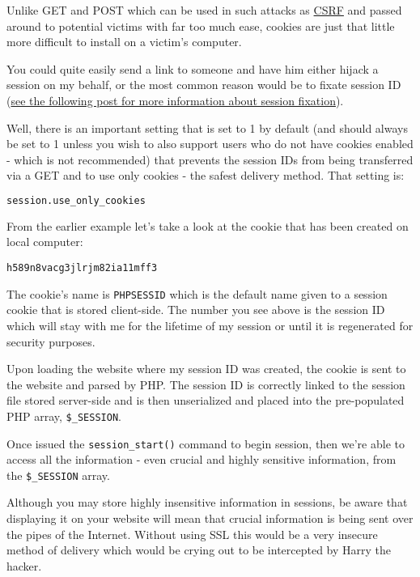 Unlike GET and POST which can be used in such attacks as \href{http://www.talkphp.com/advanced-php-programming/1063-cross-site-request-forgeries.html}{CSRF} and passed around to potential victims with far too much ease, cookies are just that little more difficult to install on a victim's computer.

You could quite easily send a link to someone and have him either hijack a session on my behalf, or the most common reason would be to fixate session ID (\href{http://www.talkphp.com/tips-tricks/1024-tips-php-security-post1813.html#post1813}{see the following post for more information about session fixation}).

Well, there is an important setting that is set to 1 by default (and should always be set to 1 unless you wish to also support users who do not have cookies enabled - which is not recommended) that prevents the session IDs from being transferred via a GET and to use only cookies - the safest delivery method. That setting is:

\begin{lstlisting}[language=bash]
session.use_only_cookies
\end{lstlisting}


From the earlier example let's take a look at the cookie that has been created on local computer:

\verb|h589n8vacg3jlrjm82ia11mff3|

The cookie's name is \texttt{PHPSESSID} which is the default name given to a session cookie that is stored client-side. The number you see above is the session ID which will stay with me for the lifetime of my session or until it is regenerated for security purposes.

Upon loading the website where my session ID was created, the cookie is sent to the website and parsed by PHP. The session ID is correctly linked to the session file stored server-side and is then unserialized and placed into the pre-populated PHP array, \texttt{\$\_SESSION}. 

Once issued the \texttt{session\_start()} command to begin session, then we're able to access all the information - even crucial and highly sensitive information, from the \texttt{\$\_SESSION} array.


Although you may store highly insensitive information in sessions, be aware that displaying it on your website will mean that crucial information is being sent over the pipes of the Internet. Without using SSL this would be a very insecure method of delivery which would be crying out to be intercepted by Harry the hacker.




